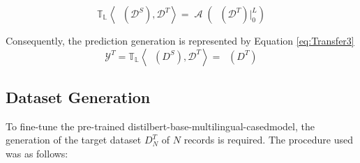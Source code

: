 \documentclass[onecolumn, journal, english, 12pt, a4paper]{IEEEtran} %
\newcommand{\modelohuggingface}{distilbert-base-multilingual-cased}
\DeclareMathOperator{\ypredtarget}{\phi^{T}}
\DeclareMathOperator{\ypredsource}{\phi^{S}}
\DeclareMathOperator{\ConvNetOut}{\mathcal{A}}
\theoremstyle{definition}
\begin{document}
\begin{equation}
  \mathbb{T_{L}} \left< \ypredsource(\mathcal{D}^{S}), \mathcal{D}^{T}  \right> = \ConvNetOut \left(\ypredsource(\mathcal{D}^{T}) \Bigr\rvert_{0}^{L} \right)
    \label{eq:Transfer2}
\end{equation}

Consequently, the prediction generation is represented by Equation
\eqref{eq:Transfer3}
\begin{equation}
    \mathcal{Y}^{T} = \mathbb{T_{L}} \left< \ypredsource(D^{S}), \mathcal{D}^{T} \right> = \ypredtarget(D^T) 
    \label{eq:Transfer3}
\end{equation}

\subsection{Dataset Generation}
To fine-tune the pre-trained \modelohuggingface model, the generation
of the target dataset $D^T_{N}$ of $N$ records is required. The
procedure used was as follows:
\end{document}
